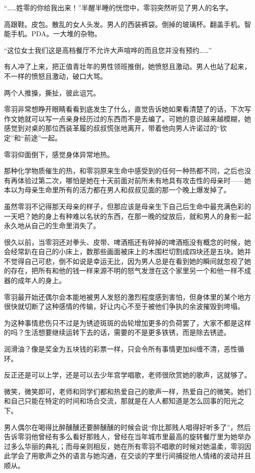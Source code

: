 \documentclass[UTF8, scheme = chinese, openany]{ctexbook}
\begin{document}
“……姓零的你给我出来！”半醒半睡的恍惚中，零羽突然听见了男人的名字。

高跟鞋。皮包。散乱的女人头发。男人的西装裤袋。倒掉的玻璃杯。翻盖手机。智能手机。PDA。一大堆的杂物。

“这位女士我们这是高档餐厅不允许大声喧哗的而且您并没有预约……\nobreak”

有人冲了上来，把正值青壮年的男性领班推倒，她愤怒且激动。男人也站了起来，不一样的愤怒且激动，破口大骂。

两个人推搡，撕扯，彼此诅咒。

零羽非常想睁开眼睛看看到底发生了什么，直觉告诉她如果看清楚了的话，下次写作文她就可以写一点亲身经历过的东西而不是去编了。可她的意识越来越模糊，她感觉到对桌的那位西装革履的叔叔慌张地离开，带着他向男人许诺过的“钦定”和“前途”一起。

零羽仰面倒下，感觉身体异常地热。

那种化学物质催生的热，和零羽原来生命中感受到的任何一种热都不同，之后也没有再体验过第二次，哪怕是她在十天前面对前所未有地具有攻击性的母亲时——她本以为母亲生命里所有的活力都在男人和叔叔见面的那一个晚上爆发掉了。

虽然零羽不记得那天母亲的样子，但那应该是母亲生下自己后生命中最充满色彩的一天吧？她的身上有种难以名状的东西，在那一晚的绽放后，就和男人的身影一起永久地从自己的生命里消失了。

很久以前，当零羽还对拳头、皮带、啤酒瓶还有碎掉的啤酒瓶没有概念的时候，她会经常趴在自己的小床上，数那些画面被床上的木围栏切割成四块还是五块。她并不觉得自己可悲，倒不如说是幸运无比，因为男人总是在看到她的瞬间就忽视了她的存在，把所有和他的钱一样来源不明的怒气发泄在这个家里另一个和他一样不成器的成年人的身上。

零羽最开始还偶尔会本能地被男人发怒的激烈程度感到害怕，但身体里的某个地方很快就切断了这种感情的传输，好让内心不至于被他们争执的余波摧毁到垮塌。

为这种事情悲伤只不过是为锈迹斑斑的齿轮增加更多的负荷罢了，大家不都是这样的吗？生活想要继续运转下去的话，需要的不是更多铁锈，而是除去锈迹。

润滑油？像是奖金为五块钱的彩票一样，只会令所有事情更加纠缠不清，恶性循环。

反正还是可以上学，还是可以去少年宫学唱歌，老师很欣赏她的歌声，这就够了。

微笑，微笑即可，老师和同学们都和热爱自己的歌声一样，热爱自己的微笑。她们和自己只能在特定的时间和场合交流，那就是在人人都知道是怎么回事的阳光之下。

男人偶尔在喝得比醉醺醺还要醉醺醺的时候会说“你比那贱人唱得好听多了”，然后告诉零羽他曾经有多么看好那贱人，曾经在当年城市里最高的旋转餐厅里为她举办过多么华丽的典礼；而母亲则相反，她在所有零羽不唱歌的时候对她温柔，零羽因此学会了用歌声之外的语言与她沟通，在交谈的字里行间捕捉他人情绪的波动并且顺从。
\end{document}
